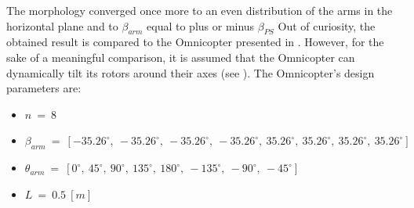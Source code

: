 The morphology converged once more to an even distribution of the arms in
the horizontal plane and to $\beta_{arm}$ equal to plus or minus $\beta_{PS}$
Out of curiosity, the obtained result is compared to the Omnicopter presented  in
\citep{brescianini_design_2016}. However, for the sake of a meaningful
comparison, it is assumed that the Omnicopter can dynamically tilt its rotors
around their axes (see ). The Omnicopter's design
parameters are:

{\small\begin{itemize}
  \item $n\ =\ 8$
  \item $\beta_{arm}\ =\ [-35.26^{\circ},\  -35.26^{\circ},\  -35.26^{\circ},\  -35.26^{\circ},\
                          35.26^{\circ},\  35.26^{\circ},\ 35.26^{\circ},\  35.26^{\circ}]$
  \item $\theta_{arm}\ =\ [0^{\circ},\  45^{\circ},\  90^{\circ},\  135^{\circ},\
                          180^{\circ},\  -135^{\circ},\ -90^{\circ},\  -45^{\circ}]$
  \item $L\ =\ 0.5\ [m]$
\end{itemize}}

